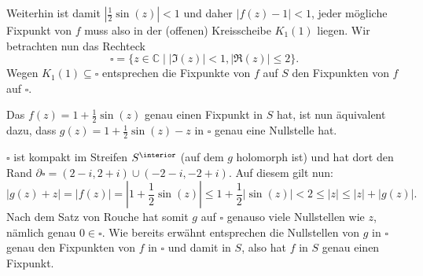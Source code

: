 \documentclass[a4paper]{article}
\begin{document}
Weiterhin ist damit $|\frac{1}{2} \sin(z)| < 1$ und daher $|f(z) - 1| < 1$, jeder mögliche Fixpunkt von $f$ muss also in der (offenen) Kreisscheibe $K_1(1)$ liegen.
Wir betrachten nun das Rechteck
\begin{equation*}
	\square = \{ z \in \mathds{C} \mid |\Im(z)|< 1, |\Re(z)| \leq 2\}\text{.}
\end{equation*}
Wegen $K_1(1) \subseteq \square$ entsprechen die Fixpunkte von $f$ auf $S$ den Fixpunkten von $f$ auf $\square$.

Das $f(z) = 1 + \frac{1}{2} \sin(z)$ genau einen Fixpunkt in $S$ hat, ist nun äquivalent dazu, dass $g(z) = 1 + \frac{1}{2} \sin(z) - z$ in $\square$ genau eine Nullstelle hat.


$\square$ ist kompakt im Streifen $S^\interior$ (auf dem $g$ holomorph ist) und hat dort den Rand $\partial \square = (2 - i, 2 + i) \cup (-2 - i, -2 + i)$. Auf diesem gilt nun:
\begin{equation*}
	|g(z) + z| = |f(z)| = |1 + \frac{1}{2} \sin(z)| \leq 1 + \frac{1}{2} | \sin(z)| < 2  \leq |z| \leq |z| + |g(z)|\text{.}
\end{equation*}
Nach dem Satz von Rouche hat somit $g$ auf $\square$ genauso viele Nullstellen wie $z$, nämlich genau $0 \in \square$.
Wie bereits erwähnt entsprechen die Nullstellen von $g$ in $\square$ genau den Fixpunkten von $f$ in $\square$ und damit in $S$, also hat $f$ in $S$ genau einen Fixpunkt.
\end{document}
